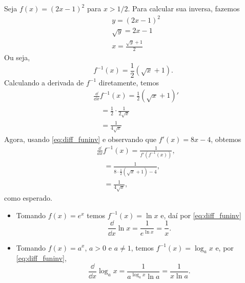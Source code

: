 \begin{ex}
  Seja $f(x) = (2x-1)^2$ para $x>1/2$. Para calcular sua inversa, fazemos
  \begin{align}
    & y = (2x-1)^2 \\
    & \sqrt{y} = 2x-1 \\
    & x = \frac{\sqrt{y}+1}{2}
  \end{align}
  Ou seja,
  \begin{equation}
    f^{-1}(x) = \frac{1}{2}(\sqrt{x}+1).
  \end{equation}
  Calculando a derivada de $f^{-1}$ diretamente, temos
  \begin{align}
    & \frac{\dd}{\dd x}f^{-1}(x) = \frac{1}{2}\left(\sqrt{x}+1\right)' \\
    & \text{}\quad = \frac{1}{2}\cdot\frac{1}{2\sqrt{x}} \\
    & \text{}\quad = \frac{1}{4\sqrt{x}}
  \end{align}
  Agora, usando \eqref{eq:diff_funinv} e observando que $f'(x) = 8x-4$, obtemos
  \begin{align}
    & \frac{\dd}{\dd x}f^{-1}(x) = \frac{1}{f'(f^{-1}(x))},\\
    & \text{}\quad = \frac{1}{8\cdot \frac{1}{2}\left(\sqrt{x}+1\right)-4}, \\
    & \text{}\quad = \frac{1}{4\sqrt{x}},
  \end{align}
  como esperado.
\end{ex}

\begin{obs}
  \begin{itemize}
  \item Tomando $f(x) = e^x$ temos $f^{-1}(x) = \ln x$ e, daí por \eqref{eq:diff_funinv}
    \begin{equation}
      \frac{\dd }{\dd x}\ln x = \frac{1}{e^{\ln x}} = \frac{1}{x}.
    \end{equation}
  \item Tomando $f(x) = a^x$, $a> 0$ e $a\neq 1$, temos $f^{-1}(x) = \log_a x$ e, por \eqref{eq:diff_funinv},
    \begin{equation}
      \frac{\dd}{\dd x}\log_a x = \frac{1}{a^{\log_a x}\ln a} = \frac{1}{x\ln a}.
    \end{equation}
  \end{itemize}
\end{obs}

